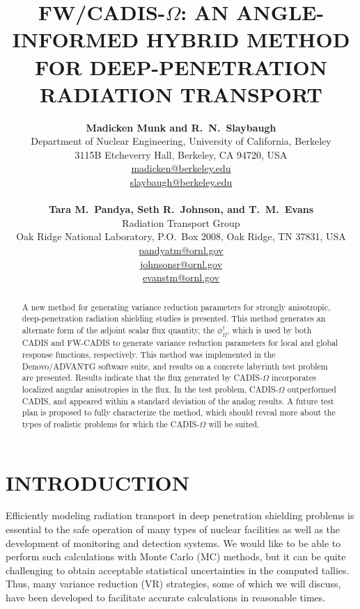 \documentclass[12pt]{article}
\title{FW/CADIS-$\Omega$: AN ANGLE-INFORMED HYBRID METHOD FOR DEEP-PENETRATION RADIATION TRANSPORT}
\author{ 
  \textbf{Madicken Munk and R.~N.~Slaybaugh} \\
  Department of Nuclear Engineering, University of California, Berkeley \\
  3115B Etcheverry Hall, Berkeley, CA 94720, USA\\
  \href{mailto:madicken@berkeley.edu}{madicken@berkeley.edu}\\
  \href{mailto:slaybaugh@berkeley.edu}{slaybaugh@berkeley.edu}\\
  \\
  \textbf{Tara M.~Pandya, Seth R.~Johnson, and T.~M.~Evans}\\
  Radiation Transport Group\\
  Oak Ridge National Laboratory, P.O.\ Box 2008, Oak Ridge, TN 37831, USA\\
  \href{mailto:pandyatm@ornl.gov}{pandyatm@ornl.gov}\\
  \href{mailto:johnsonsr@ornl.gov}{johnsonsr@ornl.gov}\\
  \href{mailto:evanstm@ornl.gov}{evanstm@ornl.gov}
  }
\begin{document}


\maketitle

\begin{abstract}
A new method for generating variance reduction parameters for strongly anisotropic, deep-penetration radiation shielding studies is presented. This method generates an alternate form of the adjoint scalar flux quantity, the $\phi^{\dagger}_{\Omega}$, which is used by both CADIS and FW-CADIS to generate variance reduction parameters for local and global response functions, respectively. This method was implemented in the Denovo/ADVANTG software suite, and results on a concrete labyrinth test problem are presented. Results indicate that the flux generated by CADIS-$\Omega$ incorporates localized angular anisotropies in the flux. In the test problem, CADIS-$\Omega$ outperformed CADIS, and appeared within a standard deviation of the analog results. A future test plan is proposed to fully characterize the method, which should reveal more about the types of realistic problems for which the CADIS-$\Omega$ will be suited. 
\end{abstract}


%
\section{INTRODUCTION}
\label{sect::intro}

Efficiently modeling radiation transport in deep penetration shielding problems is essential to the safe operation of many types of nuclear facilities as well as the development of monitoring and detection systems. We would like to be able to perform such calculations with Monte Carlo (MC) methods, but it can be quite challenging to obtain acceptable statistical uncertainties in the computed tallies. Thus, many variance reduction (VR) strategies, some of which we will discuss, have been developed to facilitate accurate calculations in reasonable times. 
\end{document}

